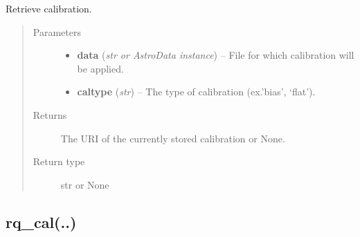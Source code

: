 \documentclass[letterpaper,10pt,english]{sphinxmanual}
\begin{document}
\begin{fulllineitems}
\label{chapter_ReductionContextClass:astrodata.RecipeManager.ReductionContext.get_cal}
Retrieve calibration.
\begin{quote}\begin{description}
\item[{Parameters}] \leavevmode\begin{itemize}
\item {} 
\textbf{data} (\emph{str or AstroData instance}) -- File for which calibration will be applied.

\item {} 
\textbf{caltype} (\emph{str}) -- The type of calibration (ex.'bias', `flat').

\end{itemize}

\item[{Returns}] \leavevmode
The URI of the currently stored calibration or None.

\item[{Return type}] \leavevmode
str or None

\end{description}\end{quote}

\end{fulllineitems}



\subsection{rq\_cal(..)}
\label{chapter_ReductionContextClass:rq-cal}
\end{document}
